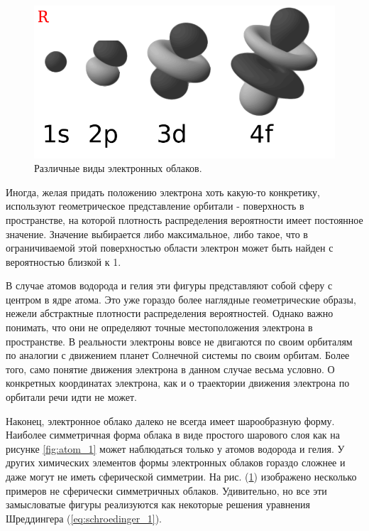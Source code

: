 \begin{figure}[t!]
   \centering
   \includegraphics[scale=0.9]{images/electron_clouds_1}
   \caption{Различные виды электронных облаков.}
   \label{fig:electron_clouds_1}
\end{figure}

Иногда, желая придать положению электрона хоть какую-то конкретику, используют геометрическое представление орбитали - поверхность в пространстве, на которой плотность распределения вероятности имеет постоянное значение.
Значение выбирается либо максимальное, либо такое, что в ограничиваемой этой поверхностью области электрон может быть найден с вероятностью близкой к 1.

В случае атомов водорода и гелия эти фигуры представляют собой сферу с центром в ядре атома.
Это уже гораздо более наглядные геометрические образы, нежели абстрактные плотности распределения вероятностей.
Однако важно понимать, что они не определяют точные местоположения электрона в пространстве. 
В реальности электроны вовсе не двигаются по своим орбиталям по аналогии с движением планет Солнечной системы по своим орбитам.
Более того, само понятие движения электрона в данном случае весьма условно.
О конкретных координатах электрона, как и о траектории движения электрона по орбитали речи идти не может.

Наконец, электронное облако далеко не всегда имеет шарообразную форму.
Наиболее симметричная форма облака в виде простого шарового слоя как на рисунке \ref{fig:atom_1} может наблюдаться только у атомов водорода и гелия.
У других химических элементов формы электронных облаков гораздо сложнее и даже могут не иметь сферической симметрии.
На рис. (\ref{fig:electron_clouds_1}) изображено несколько примеров не сферически симметричных облаков.
Удивительно, но все эти замысловатые фигуры реализуются как некоторые решения уравнения Шреддингера (\ref{eq:schroedinger_1}).




